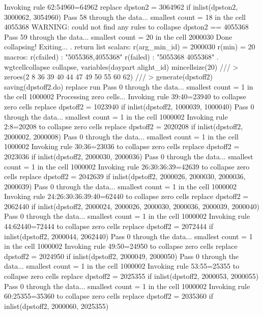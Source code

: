   Invoking rule 62:54960=64962
  replace dpston2 = 3064962 if inlist(dpston2, 3000062, 3054960)
Pass 58 through the data...
  smallest count = 18 in the cell      4055368
  WARNING: could not find any rules to collapse dpston2 == 4055368
Pass 59 through the data...
  smallest count = 20 in the cell      2000030
  Done collapsing! Exiting...
{\smallskip}
. return list
{\smallskip}
scalars:
         r(arg_min_id) =  2000030
                r(min) =  20
{\smallskip}
macros:
            r(cfailed) : "5055368,4055368"
             r(failed) : "5055368 4055368"
{\smallskip}
. wgtcellcollapse collapse, variables(daypart alight_id) mincellsize(20) ///
>         zeroes(2 8 36 39 40 44 47 49 50 55 60 62) ///
>         generate(dpstoff2) saving(dpstoff2.do) replace run
Pass 0 through the data...
  smallest count = 1 in the cell      1000002
{\smallskip}
Processing zero cells...
{\smallskip}
  Invoking rule 39:40=23940 to collapse zero cells
  replace dpstoff2 = 1023940 if inlist(dpstoff2, 1000039, 1000040)
Pass 0 through the data...
  smallest count = 1 in the cell      1000002
  Invoking rule 2:8=20208 to collapse zero cells
  replace dpstoff2 = 2020208 if inlist(dpstoff2, 2000002, 2000008)
Pass 0 through the data...
  smallest count = 1 in the cell      1000002
  Invoking rule 30:36=23036 to collapse zero cells
  replace dpstoff2 = 2023036 if inlist(dpstoff2, 2000030, 2000036)
Pass 0 through the data...
  smallest count = 1 in the cell      1000002
  Invoking rule 26:30:36:39=42639 to collapse zero cells
  replace dpstoff2 = 2042639 if inlist(dpstoff2, 2000026, 2000030, 2000036, 2000039)
Pass 0 through the data...
  smallest count = 1 in the cell      1000002
  Invoking rule 24:26:30:36:39:40=62440 to collapse zero cells
  replace dpstoff2 = 2062440 if inlist(dpstoff2, 2000024, 2000026, 2000030, 2000036, 2000039, 2000040)
Pass 0 through the data...
  smallest count = 1 in the cell      1000002
  Invoking rule 44:62440=72444 to collapse zero cells
  replace dpstoff2 = 2072444 if inlist(dpstoff2, 2000044, 2062440)
Pass 0 through the data...
  smallest count = 1 in the cell      1000002
  Invoking rule 49:50=24950 to collapse zero cells
  replace dpstoff2 = 2024950 if inlist(dpstoff2, 2000049, 2000050)
Pass 0 through the data...
  smallest count = 1 in the cell      1000002
  Invoking rule 53:55=25355 to collapse zero cells
  replace dpstoff2 = 2025355 if inlist(dpstoff2, 2000053, 2000055)
Pass 0 through the data...
  smallest count = 1 in the cell      1000002
  Invoking rule 60:25355=35360 to collapse zero cells
  replace dpstoff2 = 2035360 if inlist(dpstoff2, 2000060, 2025355)
